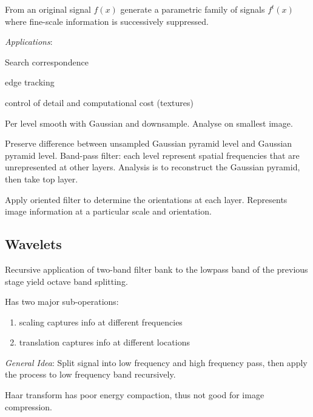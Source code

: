 \begin{definition}
  From an original signal \(f(x)\) generate a parametric family of signals \(f^t(x)\) where fine-scale information is successively suppressed.

  \textit{Applications}:
  \begin{itemize*}
    \item Search correspondence
    \item edge tracking
    \item control of detail and computational cost (textures)
  \end{itemize*}
\end{definition}

\begin{definition}
  Per level smooth with Gaussian and downsample. Analyse on smallest image. 
\end{definition}

\begin{definition}
  Preserve difference between unsampled Gaussian pyramid level and Gaussian pyramid level.
  Band-pass filter: each level represent spatial frequencies that are unrepresented at other layers.
  Analysis is to reconstruct the Gaussian pyramid, then take top layer.
\end{definition}

\begin{definition}
  Apply oriented filter to determine the orientations at each layer. Represents image information at a particular scale and orientation.
\end{definition}

\subsection{Wavelets}

\begin{definition}
  Recursive application of two-band filter bank to the lowpass band of the previous stage yield octave band splitting.
\end{definition}

\begin{algorithm}
  Has two major sub-operations:
  \begin{enumerate}
    \item scaling captures info at different frequencies
    \item translation captures info at different locations
  \end{enumerate}

  \textit{General Idea}: Split signal into low frequency and high frequency pass, then apply the process to low frequency band recursively.
\end{algorithm}

\begin{theorem}
  Haar transform has poor energy compaction, thus not good for image compression.
\end{theorem}
